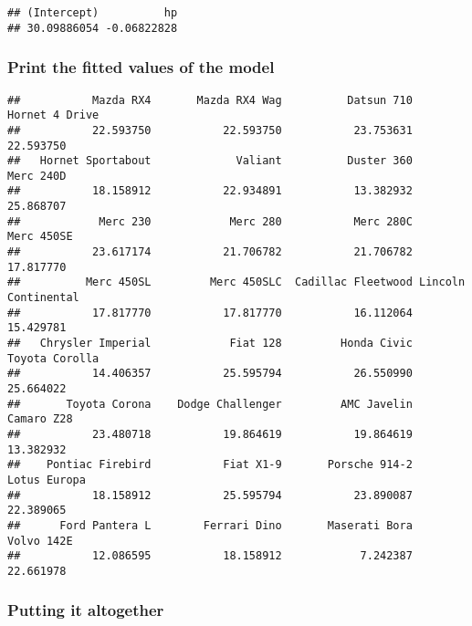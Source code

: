 \documentclass[
]{book}
\newenvironment{Shaded}{\begin{snugshade}}{\end{snugshade}}
\newcommand{\FunctionTok}[1]{\textcolor[rgb]{0.13,0.29,0.53}{\textbf{#1}}}
\newcommand{\NormalTok}[1]{#1}
\newcommand{\OtherTok}[1]{\textcolor[rgb]{0.56,0.35,0.01}{#1}}
\newcommand{\SpecialCharTok}[1]{\textcolor[rgb]{0.81,0.36,0.00}{\textbf{#1}}}
\theoremstyle{definition}
\theoremstyle{definition}
\theoremstyle{definition}
\theoremstyle{definition}
\theoremstyle{remark}
\begin{document}
\begin{verbatim}
## (Intercept)          hp 
## 30.09886054 -0.06822828
\end{verbatim}

\hypertarget{print-the-fitted-values-of-the-model}{%
\subsubsection{Print the fitted values of the model}\label{print-the-fitted-values-of-the-model}}

\begin{Shaded}
\end{Shaded}

\begin{verbatim}
##           Mazda RX4       Mazda RX4 Wag          Datsun 710      Hornet 4 Drive 
##           22.593750           22.593750           23.753631           22.593750 
##   Hornet Sportabout             Valiant          Duster 360           Merc 240D 
##           18.158912           22.934891           13.382932           25.868707 
##            Merc 230            Merc 280           Merc 280C          Merc 450SE 
##           23.617174           21.706782           21.706782           17.817770 
##          Merc 450SL         Merc 450SLC  Cadillac Fleetwood Lincoln Continental 
##           17.817770           17.817770           16.112064           15.429781 
##   Chrysler Imperial            Fiat 128         Honda Civic      Toyota Corolla 
##           14.406357           25.595794           26.550990           25.664022 
##       Toyota Corona    Dodge Challenger         AMC Javelin          Camaro Z28 
##           23.480718           19.864619           19.864619           13.382932 
##    Pontiac Firebird           Fiat X1-9       Porsche 914-2        Lotus Europa 
##           18.158912           25.595794           23.890087           22.389065 
##      Ford Pantera L        Ferrari Dino       Maserati Bora          Volvo 142E 
##           12.086595           18.158912            7.242387           22.661978
\end{verbatim}

\hypertarget{putting-it-altogether}{%
\subsubsection{Putting it altogether}\label{putting-it-altogether}}
\end{document}
